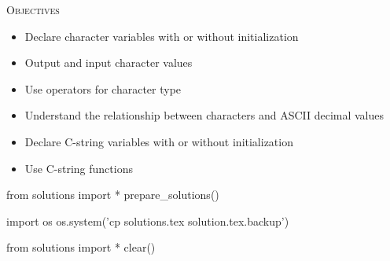 
\textsc{Objectives}
\begin{itemize}
\item Declare character variables with or without initialization
\item Output and input character values
\item Use operators for character type
\item Understand the relationship between characters and ASCII decimal values
\item Declare C-string variables with or without initialization
\item Use C-string functions
\end{itemize}














\begin{python0}
from solutions import *
prepare_solutions()
\end{python0}
\begin{python}
import os
os.system('cp solutions.tex solution.tex.backup')  
\end{python}

\begin{python0}
from solutions import *
clear()
\end{python0}
